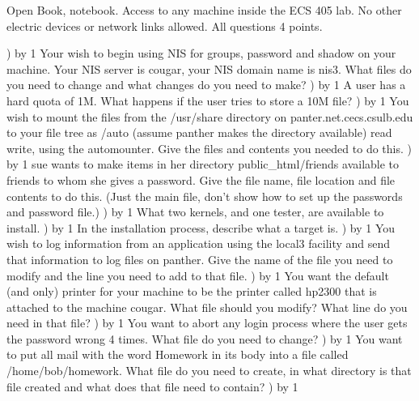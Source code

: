 
\parindent=0in
\nopagenumbers
\newcount\quesno
{}
\def\ques{\number\quesno) \advance\quesno by 1}
\def\aspace{\vskip 1.5in}

Open Book, notebook.
Access to any machine inside the ECS 405 lab.
No other electric devices or network links allowed.
All questions 4 points.

\ques
Your wish to begin using NIS for groups, password and shadow on your machine.
Your NIS server is {\ltt{}cougar}, your NIS domain name is {\ltt{}nis3}.
What files do you need to change and what changes do you need to make?
\vskip 1.8in
\ques
A user has a hard quota of 1M.
What happens if the user tries to store a 10M file?
\vskip 0.8in
\ques
You wish to mount the files from the
{\ltt{}/usr/share} directory on {\ltt{}panter.net.cecs.csulb.edu}
to your file tree as {\ltt{}/auto} (assume panther makes the directory available) read write,
using the automounter.
Give the files and contents you needed to do this.
\vskip 1.8in
\ques
{\ltt{}sue} wants to make items in her directory
{\ltt{}public_html/friends} available to friends to whom she gives a password.
Give the file name, file location and file contents to do this.
(Just the main file, don't show how to set up the passwords and password file.)
\vskip 2.2in
\vfill\eject
\ques
What two kernels, and one tester, are available to install.
\vskip 0.8in
\ques
In the installation process, describe what a target is.
\vskip 1.0in
\ques
You wish to log information
from an application
using the {\ltt{}local3} facility and
send that information to log files on panther.
Give the name of the file you need to modify and the line you need to
add to that file.
\vskip 1.0in
\ques
You want the default (and only) printer for your machine to be the printer
called {\ltt{}hp2300} that is attached to the machine {\ltt{}cougar}.
What file should you modify?
What line do you need in that file?
\vskip 1.0in
\ques
You want to abort any login process where the user
gets the password wrong 4 times.
What file do you need to change?
\vskip 0.6in
\ques
You want to put all mail with the word {\ltt{}Homework} in its body
into a file called {\ltt{}/home/bob/homework}.
What file do you need to create, in what directory is that file created
and what does that file need to contain?
\vskip 1.6in
\vfill\eject
\ques
